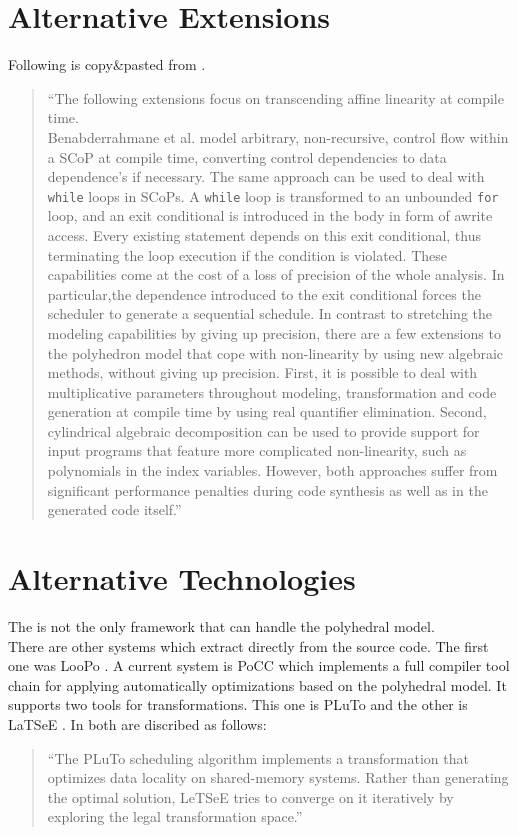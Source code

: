 \section[Alternative Extensions]{Alternative Extensions \cite{PolyhedralEmpiricalStudy}}\label{sec:altExt}
Following is copy\&pasted from \cite{PolyhedralEmpiricalStudy}.
\begin{quotation}\noindent
    \enquote{The following extensions focus on transcending affine linearity at compile time.\\
    Benabderrahmane et al. model arbitrary, non-recursive, control flow within a SCoP at compile time, converting control dependencies to data dependence's if necessary.
    The same approach can be used to deal with \texttt{while} loops in SCoPs.
    A \texttt{while} loop is transformed to an unbounded \texttt{for} loop, and an exit conditional is introduced in the body in form of awrite access.
    Every existing statement depends on this exit conditional, thus terminating the loop execution if the condition is violated.
    These capabilities come at the cost of a loss of precision of the whole analysis.
    In particular,the dependence introduced to the exit conditional forces the scheduler to generate a sequential schedule.
    In contrast to stretching the modeling capabilities by giving up precision, there are a few extensions to the polyhedron model that cope with non-linearity by using new algebraic methods, without giving up precision.
    First, it is possible to deal with multiplicative parameters throughout modeling, transformation and code generation at compile time by using real quantifier elimination.
    Second, cylindrical algebraic decomposition can be used to provide support for input programs that feature more complicated non-linearity, such as polynomials in the index variables.
    However, both approaches suffer from significant performance penalties during code synthesis as well as in the generated code itself.}
\end{quotation}

\section[Alternative Technologies]{Alternative Technologies \cite{PolyhedralEmpiricalStudy}}
The \llvm is not the only framework that can handle the polyhedral model.\\
There are other systems which extract \scops directly from the source code.
The first one was LooPo \cite{loopo}.
A current system is PoCC \cite{pocc} which implements a full compiler tool chain for applying automatically optimizations based on the polyhedral model.
It supports two tools for transformations.
This one is PLuTo \cite{pluto} and the other is LaTSeE \cite{latsee}.
In \cite{PolyhedralEmpiricalStudy} both are discribed as follows:
\begin{quotation}\noindent
    \enquote{The PLuTo scheduling algorithm implements a transformation that optimizes data locality on shared-memory systems.
    Rather than generating the optimal solution, LeTSeE tries to converge on it iteratively by exploring the legal transformation space.}
\end{quotation}
